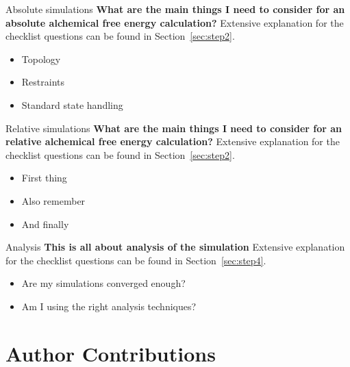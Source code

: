 \documentclass[9pt,bestpractices]{livecoms}
\begin{document}
\begin{Checklists*}[p!]
\begin{checklist}{Absolute simulations}
\textbf{What are the main things I need to consider for an absolute alchemical free energy calculation?}
Extensive explanation for the checklist questions can be found in Section~\ref{sec:step2}.
\begin{itemize}
\item Topology
\item Restraints
\item Standard state handling
\end{itemize}
\end{checklist}

\begin{checklist}{Relative simulations}
\textbf{What are the main things I need to consider for an relative alchemical free energy calculation?}
Extensive explanation for the checklist questions can be found in Section~\ref{sec:step2}.
\begin{itemize}
\item First thing
\item Also remember
\item And finally
\end{itemize}
\end{checklist}

\begin{checklist}{Analysis}
\textbf{This is all about analysis of the simulation}
Extensive explanation for the checklist questions can be found in Section~\ref{sec:step4}.
\begin{itemize}
\item Are my simulations converged enough?
\item Am I using the right analysis techniques?
\end{itemize}
\end{checklist}

\end{Checklists*}
\clearpage

\section*{Author Contributions}
%
\end{document}
